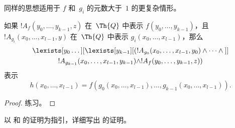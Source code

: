 \documentclass[../../../include/open-logic-section]{subfiles}
\begin{document}
同样的思想适用于 $f$ 和~$g_i$ 的元数大于~$1$ 的更复杂情形。

\begin{prop}
如果 $!A_f(y_0, \dots, y_{k-1}, z)$ 在~$\Th{Q}$ 中表示 $f(y_0, \dots, y_{k-1})$，且 $!A_{g_i}(x_0, \dots, x_{l-1}, y)$ 在~$\Th{Q}$ 中表示 $g_i(x_0, \dots, x_{l-1})$，那么
\begin{multline*}
  \lexists[y_0\dots][\lexists[y_{k-1}][(!A_{g_0}(x_0,\dots,x_{l-1},y_0) \land
      \dots \land {}]]\\
  !A_{g_{k-1}}(x_0,\dots,x_{l-1},y_{k-1}) \land !A_f(y_0,\dots,y_{k-1},z))
\end{multline*}
表示
\[
h(x_0, \dots, x_{l-1}) = f(g_0(x_0, \dots, x_{l-1}), \dots, g_{k-1}(x_0,
\dots, x_{l-1})).
\]
\end{prop}

\begin{proof}
练习。
\end{proof}

\begin{prob} %
以  和  的证明为指引，详细写出  的证明。
\end{prob}
\end{document}
